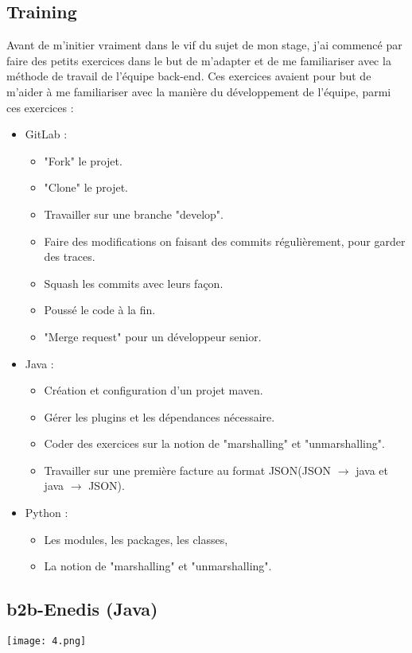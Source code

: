 \subsection{Training}
Avant de m'initier vraiment dans le vif du sujet de mon stage, j'ai commencé par faire des petits exercices dans le but de m'adapter et de me familiariser avec la méthode de travail de l'équipe back-end. Ces exercices avaient pour but de m'aider à me familiariser avec la manière du développement de l'équipe, parmi ces exercices :
\begin{itemize}
\item GitLab :
	\begin{itemize}
		\item "Fork" le projet.
		\item "Clone" le projet.
		\item Travailler sur une branche "develop".
		\item Faire des modifications on faisant des commits régulièrement, pour garder des traces.
		\item Squash les commits avec leurs façon.
		\item Poussé le code à la fin.
		\item "Merge request" pour un développeur senior.
	\end{itemize}
\item Java :
	\begin{itemize}
		\item Création et configuration d'un projet maven.
		\item Gérer les plugins et les dépendances nécessaire.
		\item Coder des exercices sur la notion de "marshalling" et "unmarshalling".
		\item Travailler sur une première facture au format JSON(JSON $\to$ java et java $\to$ JSON).
	\end{itemize}
\item Python :
	\begin{itemize}
		\item Les modules, les packages, les classes,		
		\item La notion de "marshalling" et "unmarshalling".
	\end{itemize}
\end{itemize} 
\subsection{b2b-Enedis (Java)}
\begin{center}
	\texttt{[image: 4.png]}
\end{center}
